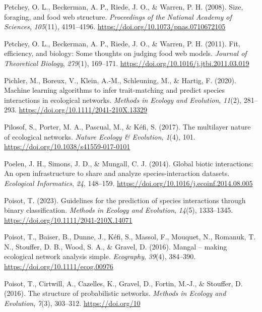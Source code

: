 \documentclass[
]{article}
\newlength{\cslhangindent}
\newenvironment{CSLReferences}[2] %
 {\begin{list}{}{%
  \setlength{\itemindent}{0pt}
  \setlength{\leftmargin}{0pt}
  \setlength{\parsep}{0pt}
  \ifodd #1
   \setlength{\leftmargin}{\cslhangindent}
   \setlength{\itemindent}{-1\cslhangindent}
  \fi
  \setlength{\itemsep}{#2\baselineskip}}}
 {\end{list}}
\begin{document}
\begin{CSLReferences}{1}{0}
Petchey, O. L., Beckerman, A. P., Riede, J. O., \& Warren, P. H. (2008).
Size, foraging, and food web structure. \emph{Proceedings of the
National Academy of Sciences}, \emph{105}(11), 4191--4196.
\url{https://doi.org/10.1073/pnas.0710672105}

Petchey, O. L., Beckerman, A. P., Riede, J. O., \& Warren, P. H. (2011).
Fit, efficiency, and biology: {Some} thoughts on judging food web
models. \emph{Journal of Theoretical Biology}, \emph{279}(1), 169--171.
\url{https://doi.org/10.1016/j.jtbi.2011.03.019}

Pichler, M., Boreux, V., Klein, A.-M., Schleuning, M., \& Hartig, F.
(2020). Machine learning algorithms to infer trait-matching and predict
species interactions in ecological networks. \emph{Methods in Ecology
and Evolution}, \emph{11}(2), 281--293.
\url{https://doi.org/10.1111/2041-210X.13329}

Pilosof, S., Porter, M. A., Pascual, M., \& Kéfi, S. (2017). The
multilayer nature of ecological networks. \emph{Nature Ecology \&
Evolution}, \emph{1}(4), 101.
\url{https://doi.org/10.1038/s41559-017-0101}

Poelen, J. H., Simons, J. D., \& Mungall, C. J. (2014). Global biotic
interactions: {An} open infrastructure to share and analyze
species-interaction datasets. \emph{Ecological Informatics}, \emph{24},
148--159. \url{https://doi.org/10.1016/j.ecoinf.2014.08.005}

Poisot, T. (2023). Guidelines for the prediction of species interactions
through binary classification. \emph{Methods in Ecology and Evolution},
\emph{14}(5), 1333--1345. \url{https://doi.org/10.1111/2041-210X.14071}

Poisot, T., Baiser, B., Dunne, J., Kéfi, S., Massol, F., Mouquet, N.,
Romanuk, T. N., Stouffer, D. B., Wood, S. A., \& Gravel, D. (2016).
Mangal -- making ecological network analysis simple. \emph{Ecography},
\emph{39}(4), 384--390. \url{https://doi.org/10.1111/ecog.00976}

Poisot, T., Cirtwill, A., Cazelles, K., Gravel, D., Fortin, M.-J., \&
Stouffer, D. (2016). The structure of probabilistic networks.
\emph{Methods in Ecology and Evolution}, \emph{7}(3), 303--312.
\url{https://doi.org/10}


\end{CSLReferences}
\end{document}
